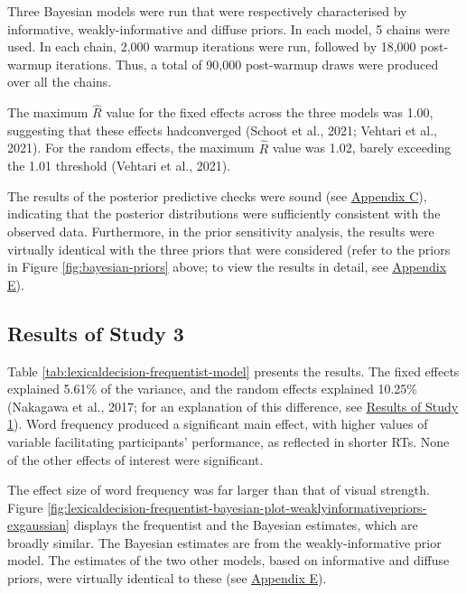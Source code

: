 \documentclass[
  12pt,
  man,floatsintext]{apa7}
\begin{document}
Three Bayesian models were run that were respectively characterised by informative, weakly-informative and diffuse priors. In each model, 5 chains were used. In each chain, 2,000 warmup iterations were run, followed by 18,000 post-warmup iterations. Thus, a total of 90,000 post-warmup draws were produced over all the chains.

The maximum \(\widehat R\) value for the fixed effects across the three models was 1.00, suggesting that these effects hadconverged (Schoot et al., 2021; Vehtari et al., 2021). For the random effects, the maximum \(\widehat R\) value was 1.02, barely exceeding the 1.01 threshold (Vehtari et al., 2021).

The results of the posterior predictive checks were sound (see \protect\hyperlink{appendix-C-Bayesian-analysis-diagnostics}{\underline{Appendix C}}), indicating that the posterior distributions were sufficiently consistent with the observed data. Furthermore, in the prior sensitivity analysis, the results were virtually identical with the three priors that were considered (refer to the priors in Figure \ref{fig:bayesian-priors} above; to view the results in detail, see \protect\hyperlink{appendix-E-Bayesian-analysis-results}{\underline{Appendix E}}).

\hypertarget{results-of-study-3}{%
\subsection{Results of Study 3}\label{results-of-study-3}}

Table \ref{tab:lexicaldecision-frequentist-model} presents the results. The fixed effects explained 5.61\% of the variance, and the random effects explained 10.25\% (Nakagawa et al., 2017; for an explanation of this difference, see \protect\hyperlink{semanticpriming-results}{\underline{Results of Study 1}}). Word frequency produced a significant main effect, with higher values of variable facilitating participants' performance, as reflected in shorter RTs. None of the other effects of interest were significant.

The effect size of word frequency was far larger than that of visual strength. Figure \ref{fig:lexicaldecision-frequentist-bayesian-plot-weaklyinformativepriors-exgaussian} displays the frequentist and the Bayesian estimates, which are broadly similar. The Bayesian estimates are from the weakly-informative prior model. The estimates of the two other models, based on informative and diffuse priors, were virtually identical to these (see \protect\hyperlink{appendix-E-Bayesian-analysis-results}{\underline{Appendix E}}).
\end{document}
